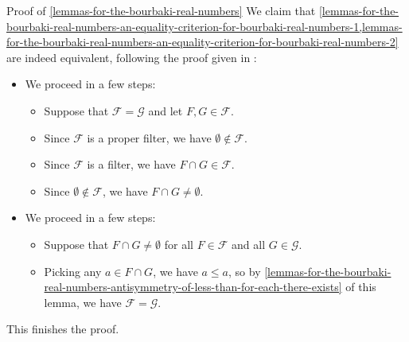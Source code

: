 \begin{Proof}{Proof of \cref{lemmas-for-the-bourbaki-real-numbers}}
    We claim that \cref{lemmas-for-the-bourbaki-real-numbers-an-equality-criterion-for-bourbaki-real-numbers-1,lemmas-for-the-bourbaki-real-numbers-an-equality-criterion-for-bourbaki-real-numbers-2} are indeed equivalent, following the proof given in \cite[Theorem 4.4]{weiss:the-reals-as-rational-cauchy-filters}:
    \begin{itemize}
        \item{}We proceed in a few steps:
            \begin{itemize}
                \item Suppose that $\mathcal{F}=\mathcal{G}$ and let $F,G\in\mathcal{F}$.
                \item Since $\mathcal{F}$ is a proper filter, we have $\emptyset\nin\mathcal{F}$.
                \item Since $\mathcal{F}$ is a filter, we have $F\cap G\in\mathcal{F}$.
                \item Since $\emptyset\nin\mathcal{F}$, we have $F\cap G\neq\emptyset$.
            \end{itemize}
        \item{}We proceed in a few steps:
            \begin{itemize}
                \item Suppose that $F\cap G\neq\emptyset$ for all $F\in\mathcal{F}$ and all $G\in\mathcal{G}$.
                \item Picking any $a\in F\cap G$, we have $a\leq a$, so by \cref{lemmas-for-the-bourbaki-real-numbers-antisymmetry-of-less-than-for-each-there-exists} of this lemma, we have $\mathcal{F}=\mathcal{G}$.
            \end{itemize}
    \end{itemize}
    This finishes the proof.
\end{Proof}
